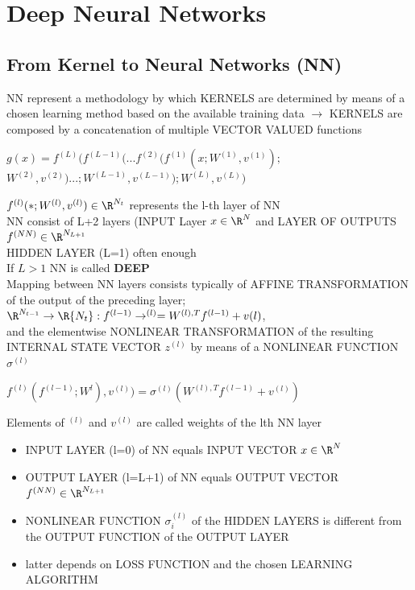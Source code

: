 \section{Deep Neural Networks}
\begin{sectionbox}
\subsection{From Kernel to Neural Networks (NN)}
NN represent a methodology by which KERNELS are determined by means of a chosen learning method based on the available training data $\rightarrow$ KERNELS are composed by a concatenation of multiple VECTOR VALUED functions
\begin{emphbox}
$g(x)=f^{(L)}(f^{(L-1)}(...f^{(2)}(f^{(1)}(x;W^{(1)},v^{(1)});$\\
$W^{(2)},v^{(2)})...;W^{(L-1)},v^{(L-1)});W^{(L)},v^{(L)})$
\end{emphbox}
$f^{(l)}(*;W^{(l)},v^{(l)})\in \R^{N_t}$ represents the l-th layer of NN\\
NN consist of L+2 layers (INPUT Layer $x \in \R^N$ and LAYER OF OUTPUTS $f^{(NN)}\in \R^{N_{L+1}}$\\
HIDDEN LAYER (L=1) often enough\\
If $L>1$ NN is called \textbf{DEEP}\\

Mapping between NN layers consists typically of AFFINE TRANSFORMATION of the output of the preceding layer;\\
$\R^{N_{t-1}}\rightarrow \R{N_t}:f^{(l-1)} \rightarrow^{(l)}=W^{(l),T}f^{(l-1)}+v{(l)}$,\\
and the elementwise NONLINEAR TRANSFORMATION of the resulting INTERNAL STATE VECTOR $z^{(l)}$ by means of a NONLINEAR FUNCTION $\sigma^{(l)}$\\
\begin{emphbox}
$f^{(l)}(f^{(l-1)};W^{l}),v^{(l)})=\sigma^{(l)}(W^{(l),T}f^{(l-1)}+v^{(l)})$
\end{emphbox}

Elements of $^{(l)}$ and $v^{(l)}$ are called weights of the lth NN layer
\begin{itemize}
\item INPUT LAYER (l=0) of NN equals INPUT VECTOR $x \in \R^N$
\item OUTPUT LAYER (l=L+1) of NN equals OUTPUT VECTOR $f^{(NN)}\in \R^{N_{L+1}}$
\item NONLINEAR FUNCTION $\sigma_i^{(l)}$ of the HIDDEN LAYERS is different from the OUTPUT FUNCTION of the OUTPUT LAYER
\item latter depends on LOSS FUNCTION and the chosen LEARNING ALGORITHM
\end{itemize}


\end{sectionbox}
